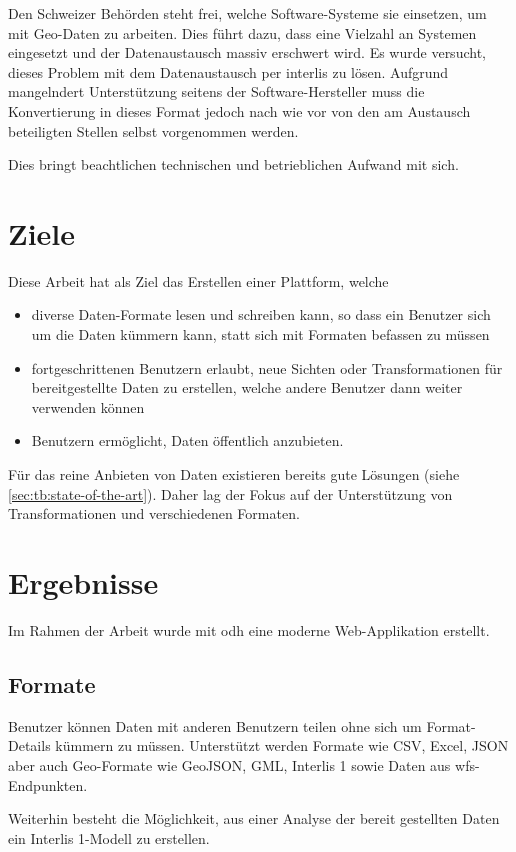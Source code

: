 Den Schweizer Behörden steht frei, welche Software-Systeme sie einsetzen, um mit Geo-Daten zu arbeiten. Dies führt dazu, dass eine Vielzahl an Systemen eingesetzt und der Datenaustausch massiv erschwert wird. Es wurde versucht, dieses Problem mit dem Datenaustausch per \gls{interlis} zu lösen. Aufgrund mangelndert Unterstützung seitens der Software-Hersteller muss die Konvertierung in dieses Format jedoch nach wie vor von den am Austausch beteiligten Stellen selbst vorgenommen werden.

Dies bringt beachtlichen technischen und betrieblichen Aufwand mit sich.

\section*{Ziele}

Diese Arbeit hat als Ziel das Erstellen einer Plattform, welche
\begin{itemize}
\item diverse Daten-Formate lesen und schreiben kann, so dass ein Benutzer sich um die Daten kümmern kann, statt sich mit Formaten befassen zu müssen
\item fortgeschrittenen Benutzern erlaubt, neue Sichten oder Transformationen für bereitgestellte Daten zu erstellen, welche andere Benutzer dann weiter verwenden können
\item Benutzern ermöglicht, Daten öffentlich anzubieten.
\end{itemize}

Für das reine Anbieten von Daten existieren bereits gute Lösungen (siehe \cref{sec:tb:state-of-the-art}). Daher lag der Fokus auf der Unterstützung von Transformationen und verschiedenen Formaten.

\section*{Ergebnisse}
Im Rahmen der Arbeit wurde mit \acf{odh} eine moderne Web-Applikation erstellt.

\subsection*{Formate}
Benutzer können Daten mit anderen Benutzern teilen ohne sich um Format-Details kümmern zu müssen. Unterstützt werden Formate wie CSV, Excel, JSON aber auch Geo-Formate wie GeoJSON, GML, Interlis 1 sowie Daten aus \gls{wfs}-Endpunkten.

Weiterhin besteht die Möglichkeit, aus einer Analyse der bereit gestellten Daten ein Interlis 1-Modell zu erstellen.

